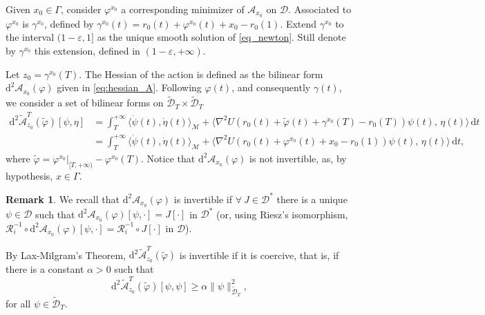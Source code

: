 \documentclass[a4paper,10pt]{amsart}
\newcommand{\ud}{\mathrm{d}}
\theoremstyle{plain}
\theoremstyle{definition}
\newtheorem{rem}[thm]{Remark}
\numberwithin{equation}{section}
\numberwithin{thm}{section}
\begin{document}
Given $x_0 \in \Gamma$, consider $\varphi^{x_0}$ a corresponding minimizer of $\mathcal A_{x_0}$ on $\mathcal D$. Associated to $\varphi^{x_0}$ is $\gamma^{x_0}$, defined by $\gamma^{x_0}(t)=r_0(t)+\varphi^{x_0}(t)+x_0-r_0(1)$. Extend $\gamma^{x_0}$ to the interval $(1-\varepsilon, 1]$ as the unique smooth solution of \eqref{eq_newton}. Still denote by $\gamma^{x_0}$ this extension, defined in $(1-\varepsilon, +\infty)$. 

Let $z_0=\gamma^{x_0}(T)$. The Hessian of the action is defined as the bilinear form $\ud^2 \mathcal{A}_{x_0}(\varphi)$ given in \eqref{eq:hessian_A}. Following $\varphi(t)$, and consequently $\gamma(t)$, we consider a set of bilinear forms on $\tilde{\mathcal D}_T\times\tilde{\mathcal D}_T$
\[
\begin{split} 
\ud^2 \tilde{\mathcal{A}}_{z_0}^{T}(\tilde\varphi)[\psi,\eta]&=\int_T^{+\infty} \langle\dot\psi(t),\dot \eta(t)\rangle_\mathcal{M}+\langle\nabla^2 U(r_0(t)+\tilde\varphi(t)+\gamma^{x_0}(T)-r_0(T))\psi(t),\,\eta(t)\rangle \,\ud t
\\
&=\int_T^{+\infty} \langle\dot\psi(t),\dot \eta(t)\rangle_\mathcal{M}+\langle \nabla^2 U(r_0(t)+\varphi^{x_0}(t)+x_0-r_0(1))\psi(t),\,\eta(t)\rangle\,\ud t,
\end{split}
\]
where $\tilde\varphi = \varphi^{x_0}|_{[T,+\infty)}-\varphi^{x_0}(T)$. Notice that $\ud^2 \mathcal{A}_{x_0}(\varphi)$ is not invertible, as, by hypothesis, $x\in\Gamma$.
\begin{rem}
\label{rem:T_0}
    We recall that $\ud^2 \mathcal{A}_{x_0}(\varphi)$ is invertible if $\forall\ J\in \mathcal{D}^*$ there is a unique $\psi\in\mathcal{D}$ such that $\ud^2 \mathcal{A}_{x_0}(\varphi)[\psi,\cdot]=J[\cdot]$ in $\mathcal{D}^*$ (or, using Riesz's isomorphism, $\mathcal{R}_i^{-1}\circ \ud^2 \mathcal{A}_{x_0}(\varphi)[\psi,\cdot]=\mathcal{R}_i^{-1}\circ J[\cdot]$ in $\mathcal{D}$).
\end{rem}

By Lax-Milgram's Theorem, $\ud^2 \tilde{\mathcal{A}}_{z_0}^{T}(\tilde\varphi)$ is invertible if it is coercive, that is, if there is a constant $\alpha>0$ such that
\begin{equation}\label{coercivity_LxT}
   \ud^2 \tilde{\mathcal{A}}_{z_0}^T(\tilde\varphi)[\psi,\psi] \geq \alpha\|\psi\|^2_{\tilde{\mathcal D}_T},    
\end{equation}
for all $\psi\in\tilde{\mathcal{D}}_T$.
\end{document}

